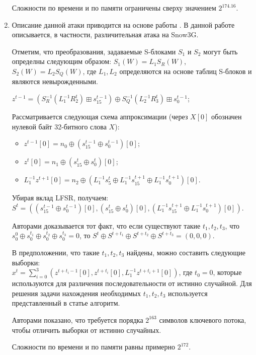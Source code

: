 \documentclass{./civarticle}
\begin{document}
\begin{enumerate}
    Сложности по времени и по памяти ограничены сверху значением $2^{174.16}$.

    \item 
    Описание данной атаки приводится на основе работы \cite{art5}. В данной работе описывается, в частности, различительная атака на Snow3G.

     Отметим, что преобразования, задаваемые S-блоками $S_1$ и $S_2$ могут быть определны следующим образом: $S_1(W) = L_1S_R(W)$, $S_2(W) = L_2S_Q(W)$, где $L_1, L_2$ определяются на основе таблиц S-блоков и являются невырожденными.
    
    $z^{t-1} = (S_R^{-1}(L_1^{-1}R_2^{t}) \boxplus s_{15}^{t-1}) \oplus S_Q^{-1}(L_2^{-1}R_3^{t}) \boxplus s_0^{t-1}$;

    Рассматривается следующая схема аппроксимации (через $X[0]$ обозначен нулевой байт 32-битного слова $X$):
    \begin{itemize}
        \item $z^{t-1}[0] = n_0 \oplus (s_{15}^{t-1} \oplus s_0^{t-1})[0]$;
        \item $z^{t}[0] = n_1 \oplus (s_{15}^{t} \oplus s_0^{t})[0]$;
        \item $L_1^{-1}z^{t+1}[0] = n_2 \oplus (L_1^{-1}s_5^{t} \oplus L_1^{-1}s_{15}^{t+1} \oplus L_1^{-1}s_0^{t+1})[0]$.
    \end{itemize}

    Убирая вклад LFSR, получаем: $S^t = ((s_{15}^{t-1} \oplus s_0^{t-1})[0], (s_{15}^{t} \oplus s_0^{t})[0], (L_1^{-1}s_{15}^{t+1} \oplus L_1^{-1}s_0^{t+1})[0])$.

    Авторами доказывается тот факт, что если существуют такие $t_1, t_2, t_3$, что $s_0^0 \oplus s_0^{t_1} \oplus s_0^{t_2} \oplus s_0^{t_3} = 0$, то $S^t \oplus S^{t + t_1} \oplus S^{t + t_2} \oplus S^{t + t_3} = (0, 0, 0)$.

    В предположении, что такие $t_1, t_2, t_3$ найдены, можно составить следующие выборки: \\ $x^t = \sum_{i=0}^{3}(z^{t+t_i-1}[0], z^{t+t_i}[0], L_1^{-1}z^{t+t_i+1}[0])$, где $t_0 = 0$, которые используются для различения последовательности от истинно случайной. Для решения задачи нахождения необходимых $t_1, t_2, t_3$ используется представленный в статье \cite{temp} алгоритм.

    Авторами показано, что требуется порядка $2^{163}$ символов ключевого потока, чтобы отличить выборки от истинно случайных.

    Сложности по времени и по памяти равны примерно $2^{172}$.
    
\end{enumerate}
\end{document}
